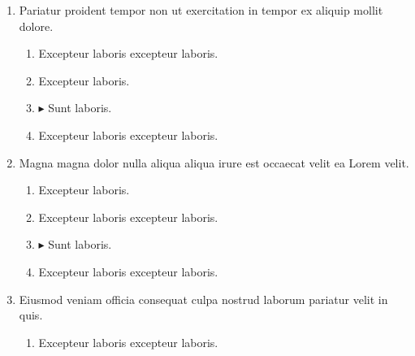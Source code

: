 \documentclass[a4paper,12pt]{article}
\begin{document}
\begin{enumerate}[label=\textbf{\arabic*.}]
\begin{multicols}{2}
\begin{enumerate}
		\item $\blacktriangleright$  Sunt laboris.
    
		\item  Excepteur laboris excepteur laboris.
    
		\item  Excepteur laboris.
    
	\end{enumerate}

\end{multicols}
\item Pariatur proident tempor non ut exercitation in tempor ex aliquip mollit dolore.
\begin{multicols}{2}
	\begin{enumerate}
		\item  Excepteur laboris excepteur laboris.
    
		\item  Excepteur laboris.
    
		\item $\blacktriangleright$  Sunt laboris.
    
		\item  Excepteur laboris excepteur laboris.
  
	\end{enumerate}

\end{multicols}
\item Magna magna dolor nulla aliqua aliqua irure est occaecat velit ea Lorem velit.
\begin{multicols}{2}
	\begin{enumerate}
		\item  Excepteur laboris.
    
		\item  Excepteur laboris excepteur laboris.
    
		\item $\blacktriangleright$  Sunt laboris.
    
		\item  Excepteur laboris excepteur laboris.
  
	\end{enumerate}

\end{multicols}
\item Eiusmod veniam officia consequat culpa nostrud laborum pariatur velit in quis.
\begin{multicols}{2}
	\begin{enumerate}
		\item  Excepteur laboris excepteur laboris.
  

\end{enumerate}
\end{multicols}
\end{enumerate}
\end{document}
